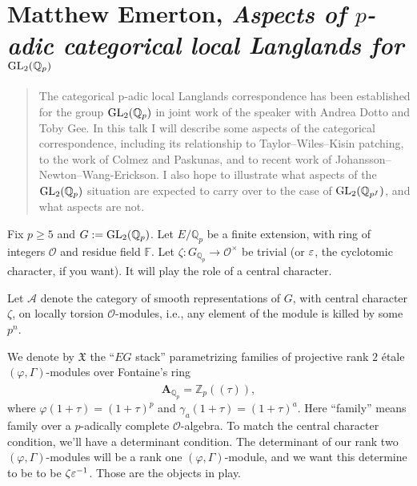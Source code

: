 \documentclass[reqno]{amsart} 
\begin{document}
\part{Matthew Emerton, \emph{Aspects of $p$-adic categorical local Langlands for $\operatorname{GL}_2(\mathbb{Q}_p)$}}

\begin{abstract}
  The categorical p-adic local Langlands correspondence has been established for the group $\operatorname{GL}_2(\mathbb{Q}_p)$ in joint work of the speaker with Andrea Dotto and Toby Gee. In this talk I will describe some aspects of the categorical correspondence, including its relationship to Taylor--Wiles--Kisin patching, to the work of Colmez and Paskunas, and to recent work of Johansson--Newton--Wang-Erickson. I also hope to illustrate what aspects of the $\operatorname{GL}_2(\mathbb{Q}_p)$ situation are expected to carry over to the case of $\operatorname{GL}_2(\mathbb{Q}_{p^f})$, and what aspects are not.
\end{abstract}

Fix $p \geq 5$ and $G := \operatorname{GL}_2(\mathbb{Q}_p)$.  Let $E / \mathbb{Q}_p$ be a finite extension, with ring of integers $\mathcal{O}$ and residue field $\mathbb{F}$.  Let $\zeta : G_{\mathbb{Q}_p} \rightarrow \mathcal{O}^\times$ be trivial (or $\varepsilon$, the cyclotomic character, if you want).  It will play the role of a central character.

Let $\mathcal{A}$ denote the category of smooth representations of $G$, with central character $\zeta$, on locally torsion $\mathcal{O}$-modules, i.e., any element of the module is killed by some $p^n$.

We denote by $\mathfrak{X}$ the ``$E G$ stack'' parametrizing families of projective rank $2$ {\'e}tale $(\varphi, \Gamma)$-modules over Fontaine's ring
\begin{equation*}
  \mathbf{A}_{\mathbb{Q}_p} = \widehat{\mathbb{Z}_p((\tau))},
\end{equation*}
where $\varphi(1 + \tau) =(1 + \tau)^p$ and $\gamma_a(1 + \tau) =(1 + \tau)^a$.  Here ``family'' means family over a $p$-adically complete $\mathcal{O}$-algebra.  To match the central character condition, we'll have a determinant condition.  The determinant of our rank two $(\varphi, \Gamma)$-modules will be a rank one $(\varphi, \Gamma)$-module, and we want this determine to be to be $\zeta \varepsilon^{-1}$.  Those are the objects in play.
\end{document}
